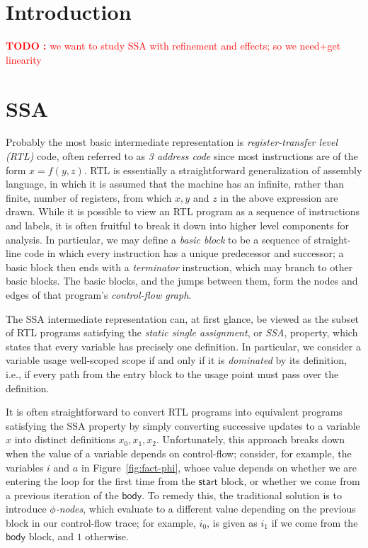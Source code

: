 \documentclass[acmsmall,screen,review]{acmart}
\newcounter{todos}
\newcommand{\TODO}[1]{{
  \stepcounter{todos}
  \begin{center}\large{\textcolor{red}{\textbf{TODO \arabic{todos}:} #1}}\end{center}
}}
\newcommand{\ms}[1]{\ensuremath{\mathsf{#1}}}
\begin{document}
\maketitle

\section{Introduction}

\TODO{we want to study SSA with refinement and effects; so we need+get linearity}

\section{SSA}

Probably the most basic intermediate representation is \emph{register-transfer level (RTL)} code,
often referred to as \emph{3 address code} since most instructions are of the form $x = f(y, z)$.
RTL is essentially a straightforward generalization of assembly language, in which it is assumed
that the machine has an infinite, rather than finite, number of registers, from which $x, y$ and $z$
in the above expression are drawn.  While it is possible to view an RTL program as a sequence of
instructions and labels, it is often fruitful to break it down into higher level components for
analysis. In particular, we may define a \emph{basic block} to be a sequence of straight-line code
in which every instruction has a unique predecessor and successor; a basic block then ends with a
\emph{terminator} instruction, which may branch to other basic blocks. The basic blocks, and the
jumps between them, form the nodes and edges of that program's \emph{control-flow graph}.

The SSA intermediate representation can, at first glance, be viewed as the subset of RTL programs
satisfying the \emph{static single assignment}, or \emph{SSA}, property, which states that every
variable has precisely one definition. In particular, we consider a variable usage well-scoped scope
if and only if it is \emph{dominated} by its definition, i.e., if every path from the entry block to
the usage point must pass over the definition.

It is often straightforward to convert RTL programs into equivalent programs satisfying the SSA
property by simply converting successive updates to a variable $x$ into distinct definitions $x_0,
x_1, x_2$.  Unfortunately, this approach breaks down when the value of a variable depends on
control-flow; consider, for example, the variables $i$ and $a$ in Figure~\ref{fig:fact-phi}, whose
value depends on whether we are entering the loop for the first time from the \ms{start} block, or
whether we come from a previous iteration of the \ms{body}. To remedy this, the traditional solution
is to introduce \emph{$\phi$-nodes}, which evaluate to a different value depending on the previous
block in our control-flow trace; for example, $i_0$, is given as $i_1$ if we come from the \ms{body}
block, and $1$ otherwise.
\end{document}
